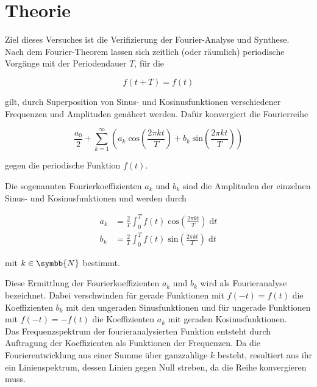 \section{Theorie}
\label{sec:Theorie}

Ziel dieses Versuches ist die Verifizierung der Fourier-Analyse und Synthese. \\

Nach dem Fourier-Theorem lassen sich zeitlich (oder räumlich) periodische Vorgänge mit der Periodendauer
$T$, für die

\begin{equation}
    f(t + T) = f(t) 
\end{equation}

gilt, durch Superposition von Sinus- und Kosinusfunktionen verschiedener Frequenzen und Amplituden genähert werden.
Dafür konvergiert die Fourierreihe

\begin{equation}
    \label{eqn:Entwicklung}
    \frac{a_0}{2} + \sum^\infty_{k = 1} \left(a_k \;  \text{cos}\left(\frac{2 \pi k t}{T} \right) + b_k \; \text{sin}
    \left(\frac{2 \pi k t}{T} \right) \right)
\end{equation}

gegen die periodische Funktion $f(t)$.   

Die sogenannten Fourierkoeffizienten $a_k$ und $b_k$ sind die Amplituden der einzelnen Sinus- und Kosinusfunktionen 
 und werden durch 

\begin{align}
    \label{eqn:Koeff}
    a_k &= \frac{2}{T} \int_0^T f(t) \; \text{cos}\left(\frac{2 \pi k t}{T} \right) \; \text{d}t \\
    b_k &= \frac{2}{T} \int_0^T f(t) \; \text{sin}\left(\frac{2 \pi k t}{T} \right) \; \text{d}t
\end{align}

mit $k \in \symbb{N}$ bestimmt. 

Diese Ermittlung der Fourierkoeffizienten $a_k$ und $b_k$ wird als Fourieranalyse bezeichnet.
Dabei verschwinden für gerade Funktionen mit $f(-t) = f(t)$ die Koeffizienten $b_k$ mit den ungeraden Sinusfunktionen und für
ungerade Funktionen mit $f(-t) = -f(t)$ die Koeffizienten $a_k$ mit geraden Kosinusfunktionen. \\

Das Frequenzspektrum der fourieranalysierten Funktion entsteht durch Auftragung der Koeffizienten als Funktionen der Frequenzen.
Da die Fourierentwicklung aus einer Summe über ganzzahlige $k$ besteht, resultiert aus ihr ein Linienspektrum, dessen
Linien gegen Null streben, da die Reihe konvergieren muss.

